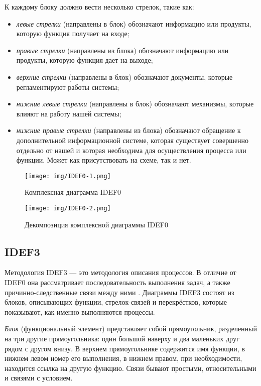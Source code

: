 \documentclass[14pt,russian]{extarticle}
\newcommand*\obj[1]{\textit{#1}}
\begin{document}
К каждому блоку должно вести несколько стрелок, такие как:

\begin{itemize}
	\item \obj{левые стрелки} (направлены в блок) обозначают информацию или
		продукты, которую функция получает на входе;

	\item \obj{правые стрелки} (направлены из блока) обозначают информацию
		или продукты, которую функция дает на выходе;

	\item \obj{верхние стрелки} (направлены в блок) обозначают документы,
		которые регламентируют работы системы;

	\item \obj{нижние левые стрелки} (направлены в блок) обозначают
		механизмы, которые влияют на работу нашей системы;

	\item \obj{нижние правые стрелки} (направлены из блока) обозначают
		обращение к дополнительной информационной системе, которая
		существует совершенно отдельно от нашей и которая необходима для
		осуществления процесса или функции. Может как присутствовать на
		схеме, так и нет.
\end{itemize}

\begin{figure}[H]
	\centering
	\texttt{[image: img/IDEF0-1.png]}
	\caption{Комплексная диаграмма IDEF0}
\end{figure}

\begin{sidewaysfigure}
	\centering
	\texttt{[image: img/IDEF0-2.png]}
	\caption{Декомпозиция комплексной диаграммы IDEF0}
\end{sidewaysfigure}

\subsection{IDEF3}

Методология IDEF3 –-- это методология описания процессов. В отличие от IDEF0 она
рассматривает последовательность выполнения задач, а также причинно-следственные
связи между ними \cite{idef3}. Диаграммы IDEF3 состоят из блоков, описывающих функции,
стрелок-связей и перекрёстков, которые показывают, как именно выполняются
процессы.

\obj{Блок} (функциональный элемент) представляет собой прямоугольник, разделенный на
три другие прямоугольника: один большой наверху и два маленьких друг рядом с
другом внизу. В верхнем прямоугольнике содержится имя функции, в нижнем левом
номер его выполнения, в нижнем правом, при необходимости, находится ссылка на
другую функцию. Связи бывают простыми, относительными и связями с условием.
\end{document}
